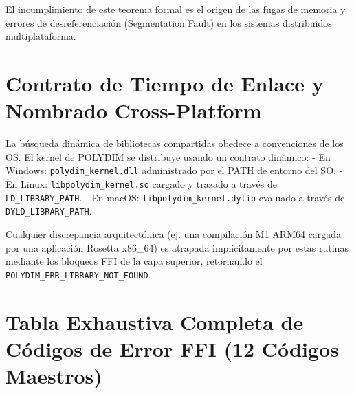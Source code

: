 El incumplimiento de este teorema formal es el origen de las fugas de memoria y errores de desreferenciación (Segmentation Fault) en los sistemas distribuidos multiplataforma.

\section{Contrato de Tiempo de Enlace y Nombrado Cross-Platform}
La búsqueda dinámica de bibliotecas compartidas obedece a convenciones de los OS. El kernel de POLYDIM se distribuye usando un contrato dinámico:
- En Windows: \texttt{polydim\_kernel.dll} administrado por el PATH de entorno del SO.
- En Linux: \texttt{libpolydim\_kernel.so} cargado y trazado a través de \texttt{LD\_LIBRARY\_PATH}.
- En macOS: \texttt{libpolydim\_kernel.dylib} evaluado a través de \texttt{DYLD\_LIBRARY\_PATH}.

Cualquier discrepancia arquitectónica (ej. una compilación M1 ARM64 cargada por una aplicación Rosetta x86\_64) es atrapada implícitamente por estas rutinas mediante los bloqueos FFI de la capa superior, retornando el \texttt{POLYDIM\_ERR\_LIBRARY\_NOT_FOUND}.

\section{Tabla Exhaustiva Completa de Códigos de Error FFI (12 Códigos Maestros)}

